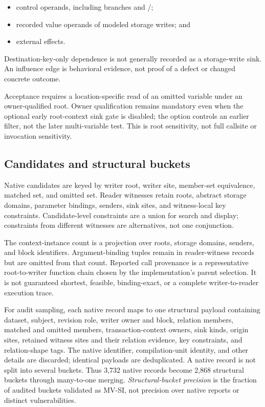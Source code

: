 \begin{itemize}[leftmargin=*,nosep]
  \item control operands, including branches and /;
  \item recorded value operands of modeled storage writes; and
  \item external effects.
\end{itemize}

Destination-key-only dependence is not generally recorded as a storage-write sink. An influence edge is behavioral evidence, not proof of a defect or changed concrete outcome.

Acceptance requires a location-specific read of an omitted variable under an owner-qualified root. Owner qualification remains mandatory even when the optional early root-context sink gate is disabled; the option controls an earlier filter, not the later multi-variable test. This is root sensitivity, not full callsite or invocation sensitivity.

\subsection{Candidates and structural buckets}
\label{s:candidate-construction}

Native candidates are keyed by writer root, writer site, member-set equivalence, matched set, and omitted set. Reader witnesses retain roots, abstract storage domains, parameter bindings, senders, sink sites, and witness-local key constraints. Candidate-level constraints are a union for search and display; constraints from different witnesses are alternatives, not one conjunction.

The context-instance count is a projection over roots, storage domains, senders, and block identifiers. Argument-binding tuples remain in reader-witness records but are omitted from that count. Reported call provenance is a representative root-to-writer function chain chosen by the implementation's parent selection. It is not guaranteed shortest, feasible, binding-exact, or a complete writer-to-reader execution trace.

For audit sampling, each native record maps to one structural payload containing dataset, subject, revision role, writer owner and block, relation members, matched and omitted members, transaction-context owners, sink kinds, origin sites, retained witness sites and their relation evidence, key constraints, and relation-shape tags. The native identifier, compilation-unit identity, and other details are discarded; identical payloads are deduplicated. A native record is not split into several buckets. Thus 3,732  native records become 2,868 structural buckets through many-to-one merging. \emph{Structural-bucket precision} is the fraction of audited buckets validated as MV-SI, not precision over native reports or distinct vulnerabilities.

